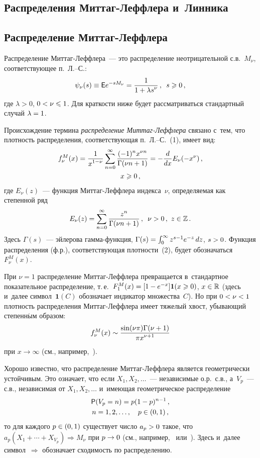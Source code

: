 \begin{multicols}{2}
\section{Распределения Миттаг-Леффлера и~Линника}

\subsection{Распределение Миттаг-Леффлера}

Распределение Миттаг-Леф\-фле\-ра~--- это распределение неотрицательной
с.в.~$M_{\nu}$, соответствующее п.~Л.--С.:
\begin{equation}
\psi_{\nu}(s)\equiv {\sf E}e^{-sM_{\nu}}=\displaystyle\frac{\displaystyle 1\mathstrut}{\displaystyle 1+\lambda
s^{\nu}\mathstrut}\,,\enskip s\geqslant0\,,
\label{e1-kor}
\end{equation}
где $\lambda>0$, $0\hm<\nu\hm\leqslant1$. Для краткости ниже будет
рассматриваться стандартный случай $\lambda\hm=1$.

Происхождение термина \textit{распределение Мит\-таг-Леф\-фле\-ра} связано 
с~тем, что плотность распределения, соответствующая п.~Л.--С.~(1),
имеет вид:
\begin{multline}
f_{\nu}^{M}(x)=\displaystyle\frac{\displaystyle 1\mathstrut}{\displaystyle x^{1-\nu}\mathstrut}\sum\limits_{n=0}^{\infty}\displaystyle\frac{\displaystyle (-1)^nx^{\nu
n}\mathstrut}{\displaystyle \Gamma(\nu n+1)\mathstrut}=-\displaystyle\frac{\displaystyle d\mathstrut}{\displaystyle dx\mathstrut}E_{\nu}(-x^{\nu})\,,\\
x\geqslant0\,,
\label{e2-kor}
\end{multline}
где $E_{\nu}(z)$~--- функция Мит\-таг-Леф\-фле\-ра индекса~$\nu$,
определяемая как степенной ряд
$$
E_{\nu}(z)=\sum\limits_{n=0}^{\infty}\displaystyle\frac{\displaystyle z^n\mathstrut}{\displaystyle \Gamma(\nu n+1)\mathstrut}\,,\enskip
 \nu>0\,,\ z\in\mathbb{Z}\,.
$$
Здесь $\Gamma(s)$~--- эйлерова гамма-функ\-ция,
$\Gamma(s)\hm=\int\nolimits_{0}^{\infty}z^{s-1}e^{-z}\,dz$, $s\hm>0$. Функция
распределения (ф.р.), соответствующая плотности~(2), будет
обозначаться~$F_{\nu}^{M}(x)$.

При $\nu=1$ распределение Мит\-таг-Леф\-фле\-ра превращается в~стандартное
показательное распределение, т.\,е.\ $F_1^{M}(x)\hm=
[1-e^{-x}]\mathbf{1}(x\hm\geqslant 0)$, $x\hm\in\mathbb{R}$ (здесь и~далее
символ~$\mathbf{1}(C)$ обозначает индикатор множества~$C$). Но при
$0\hm<\nu\hm<1$ плотность распределения Мит\-таг-Леф\-фле\-ра имеет тяжелый
хвост, убывающий степенн$\acute{\mbox{ы}}$м образом:
$$
f_\nu^{M}(x)\sim \displaystyle\frac{\displaystyle \sin(\nu\pi)\Gamma(\nu+1)\mathstrut}{\displaystyle \pi x^{\nu+1}\mathstrut}
$$
при $x\to\infty$ (см., например,~\cite{Kilbas2014}).

Хорошо известно, что распределение Миттаг-Леффлера является
геометрически устойчивым. Это означает, что если $X_1,X_2,\ldots$~---
независимые о.р.\ с.в., а~$V_p$~--- с.в., независимая от
$X_1,X_2,\ldots$ и~име\-ющая геометрическое распределение
\begin{multline}
{\sf P}(V_p=n)=p(1-p)^{n-1}\,,\\
n=1,2,\ldots,\quad
p\in(0,1)\,,
\label{e3-kor}
\end{multline}
то для каждого $p\hm\in(0,1)$ существует число $a_p\hm>0$ такое, что
$a_p(X_1+\cdots+X_{V_p})\Longrightarrow M_{\nu}$ при $p\hm\to 0$ (см.,
например,~\cite{Bunge1996} или~\cite{KlebanovRachev1996}). Здесь 
и~далее символ~$\Longrightarrow$ обозначает сходимость по
рас\-пре\-де\-ле\-нию.
{

}
\end{multicols}
